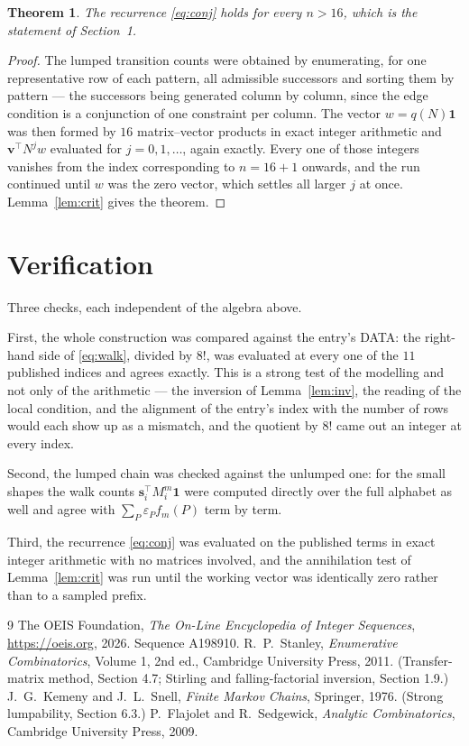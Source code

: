 \documentclass[11pt,a4paper]{article}
\theoremstyle{plain}
\newtheorem{theorem}{Theorem}
\theoremstyle{definition}
\begin{document}
\begin{theorem}
The recurrence \eqref{eq:conj} holds for every $n>16$, which is the statement of
Section~1.
\end{theorem}

\begin{proof}
The lumped transition counts were obtained by enumerating, for one representative row of
each pattern, all admissible successors and sorting them by pattern --- the successors being
generated column by column, since the edge condition is a conjunction of one constraint per
column. The vector $w=q(N)\mathbf{1}$ was then formed by $16$ matrix--vector products
in exact integer arithmetic and $\mathbf{v}^{\!\top}N^{j}w$ evaluated for
$j=0,1,\dots$, again exactly. Every one of those integers vanishes from the index
corresponding to $n=16+1$ onwards, and the run continued until $w$ was the zero vector,
which settles all larger $j$ at once. Lemma~\ref{lem:crit} gives the theorem.
\end{proof}

\section{Verification}

Three checks, each independent of the algebra above.

First, the whole construction was compared against the entry's DATA: the right-hand side of
\eqref{eq:walk}, divided by $8!$, was evaluated at every one of the $11$
published indices and agrees exactly. This is a strong test of the modelling and not only of
the arithmetic --- the inversion of Lemma~\ref{lem:inv}, the reading of the local
condition, and the alignment of the entry's index with the number of rows would each
show up as a mismatch, and the quotient by $8!$ came out an integer at every index.

Second, the lumped chain was checked against the unlumped one: for the small shapes the walk
counts $\mathbf{s}_i^{\!\top}M_i^{m}\mathbf{1}$ were computed directly over the full
alphabet as well and agree with $\sum_P\varepsilon_Pf_m(P)$ term by term.

Third, the recurrence \eqref{eq:conj} was evaluated on the published terms in exact integer
arithmetic with no matrices involved, and the annihilation test of Lemma~\ref{lem:crit} was
run until the working vector was identically zero rather than to a sampled prefix.

\begin{thebibliography}{9}
 The OEIS Foundation, \emph{The On-Line Encyclopedia of Integer
Sequences}, \url{https://oeis.org}, 2026. Sequence A198910.
 R.~P.~Stanley, \emph{Enumerative Combinatorics}, Volume 1, 2nd ed.,
Cambridge University Press, 2011. (Transfer-matrix method, Section 4.7; Stirling and
falling-factorial inversion, Section 1.9.)
 J.~G.~Kemeny and J.~L.~Snell, \emph{Finite Markov Chains}, Springer,
1976. (Strong lumpability, Section 6.3.)
 P.~Flajolet and R.~Sedgewick, \emph{Analytic Combinatorics}, Cambridge
University Press, 2009.
\end{thebibliography}
\end{document}
